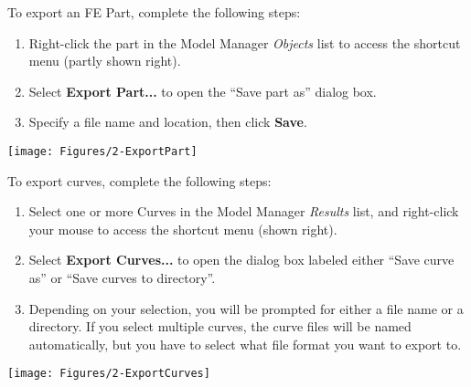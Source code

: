 
To export an FE Part, complete the following steps:

\noindent
\begin{minipage}{0.65\textwidth}
  \raggedright
  \begin{enumerate}
  \item Right-click the part in the Model Manager {\sl Objects} list to access
    the shortcut menu (partly shown right).
  \item Select \textbf{Export Part...} to open the \newline
    ``Save part as'' dialog box.
  \item Specify a file name and location, \newline
    then click \textbf{Save}.
  \end{enumerate}
\end{minipage}%
\begin{minipage}{0.35\textwidth}
  \raggedleft
  \texttt{[image: Figures/2-ExportPart]}
\end{minipage}



To export curves, complete the following steps:

\noindent
\begin{minipage}{0.5\textwidth}
  \raggedright
  \begin{enumerate}
  \item Select one or more Curves in the Model Manager {\sl Results} list,
    and right-click your mouse to access the shortcut menu (shown right).
  \item Select \textbf{Export Curves...} to open the dialog box labeled either
    ``Save curve as'' or ``Save curves to directory''.
  \item Depending on your selection, you will be prompted for either a
    file name or a directory.
    If you select multiple curves, the curve files will be named automatically,
    \newline but you have to select what file format you want to export to.
  \end{enumerate}
\end{minipage}%
\begin{minipage}{0.5\textwidth}
  \raggedleft
  \texttt{[image: Figures/2-ExportCurves]}
\end{minipage}

